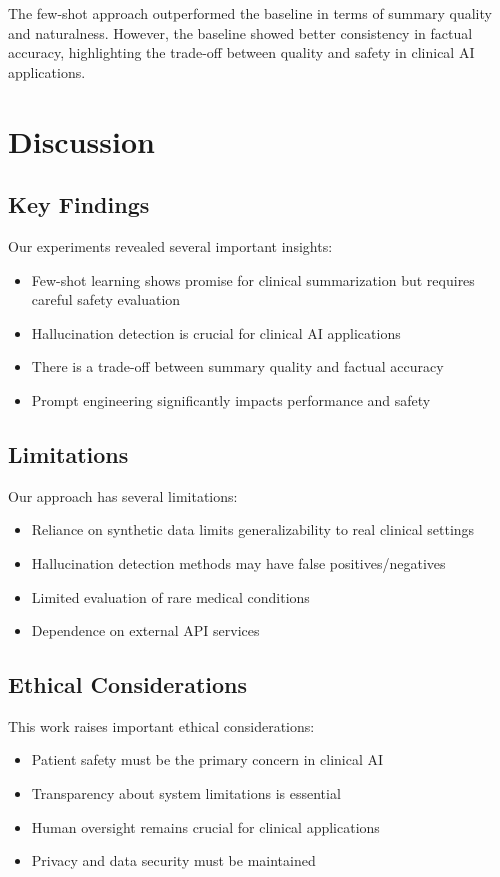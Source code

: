 \documentclass[sigconf]{acmart}
\begin{document}
The few-shot approach outperformed the baseline in terms of summary quality and naturalness. However, the baseline showed better consistency in factual accuracy, highlighting the trade-off between quality and safety in clinical AI applications.

\section{Discussion}

\subsection{Key Findings}

Our experiments revealed several important insights:
\begin{itemize}
    \item Few-shot learning shows promise for clinical summarization but requires careful safety evaluation
    \item Hallucination detection is crucial for clinical AI applications
    \item There is a trade-off between summary quality and factual accuracy
    \item Prompt engineering significantly impacts performance and safety
\end{itemize}

\subsection{Limitations}

Our approach has several limitations:
\begin{itemize}
    \item Reliance on synthetic data limits generalizability to real clinical settings
    \item Hallucination detection methods may have false positives/negatives
    \item Limited evaluation of rare medical conditions
    \item Dependence on external API services
\end{itemize}

\subsection{Ethical Considerations}

This work raises important ethical considerations:
\begin{itemize}
    \item Patient safety must be the primary concern in clinical AI
    \item Transparency about system limitations is essential
    \item Human oversight remains crucial for clinical applications
    \item Privacy and data security must be maintained
\end{itemize}
\end{document}
